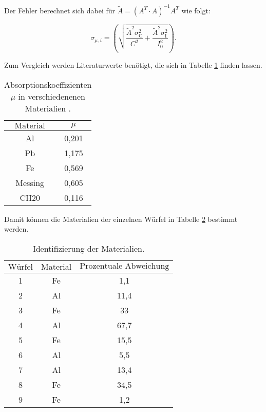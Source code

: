 Der Fehler berechnet sich dabei für $\tilde{A} = \left(A^T \cdot A\right)^{-1}A^T$ wie folgt:

\begin{equation*}
  \sigma_{\mu,i} = \left(\sqrt{\frac{\tilde{A}^2\sigma_\text{C}^2}{C^2}+\frac{\tilde{A}^2\sigma_\text{I}^2}{I_0^2}}\right).
\end{equation*}

Zum Vergleich werden Literaturwerte benötigt, die sich in Tabelle \ref{tab:lit} finden lassen. 

\begin{table}[H]
  \centering
  \caption{Absorptionskoeffizienten $\mu$ in verschiedenenen Materialien \cite{lit}.}
  \label{tab:lit}
  \begin{tabular}{c c}
  \toprule
  $\text{Material}$ & $\mu$\\
  \midrule
      Al & 0,201\\
      Pb & 1,175\\
      Fe & 0,569\\
      Messing & 0,605\\
      CH20  & 0,116\\
  \bottomrule
  \end{tabular}
\end{table}

Damit können die Materialien der einzelnen Würfel in Tabelle \ref{tab:mat} bestimmt werden. 

\begin{table}[H]
  \centering
  \caption{Identifizierung der Materialien.}
  \label{tab:mat}
  \begin{tabular}{c c c}
  \toprule
  $\text{Würfel}$ & $\text{Material}$ & $\text{Prozentuale Abweichung}$\\
  \midrule
    1 & Fe & 1,1\\
    2 & Al & 11,4\\
    3 & Fe & 33\\
    4 & Al & 67,7\\
    5 & Fe & 15,5\\
    6 & Al & 5,5\\
    7 & Al & 13,4\\
    8 & Fe & 34,5 \\
    9 & Fe & 1,2\\
  \bottomrule
  \end{tabular}
\end{table}